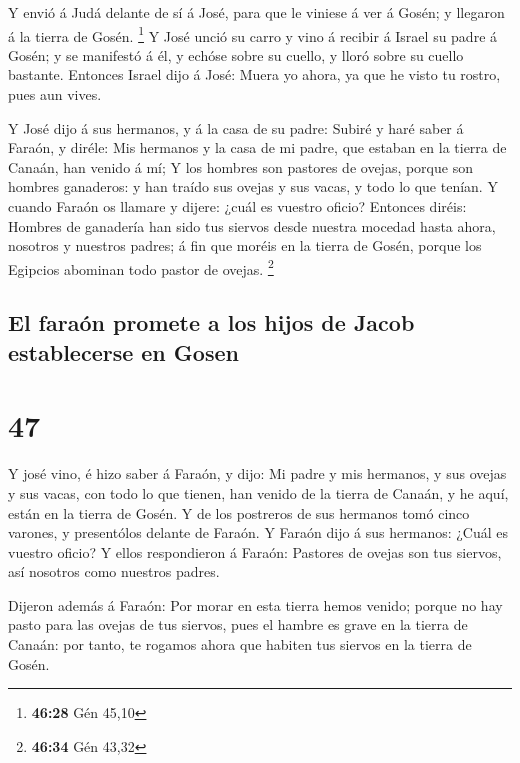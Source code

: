  Y envió á Judá delante de sí á José, para que le viniese á
ver á Gosén; y llegaron á la tierra de Gosén. \footnote{\textbf{46:28}
  Gén 45,10}  Y José unció su carro y vino á recibir á
Israel su padre á Gosén; y se manifestó á él, y echóse sobre su cuello,
y lloró sobre su cuello bastante.  Entonces Israel dijo á
José: Muera yo ahora, ya que he visto tu rostro, pues aun vives.

 Y José dijo á sus hermanos, y á la casa de su padre:
Subiré y haré saber á Faraón, y diréle: Mis hermanos y la casa de mi
padre, que estaban en la tierra de Canaán, han venido á mí;
 Y los hombres son pastores de ovejas, porque son hombres
ganaderos: y han traído sus ovejas y sus vacas, y todo lo que tenían.
 Y cuando Faraón os llamare y dijere: ¿cuál es vuestro
oficio?  Entonces diréis: Hombres de ganadería han sido tus
siervos desde nuestra mocedad hasta ahora, nosotros y nuestros padres; á
fin que moréis en la tierra de Gosén, porque los Egipcios abominan todo
pastor de ovejas. \footnote{\textbf{46:34} Gén 43,32}

\hypertarget{el-farauxf3n-promete-a-los-hijos-de-jacob-establecerse-en-gosen}{%
\subsection{El faraón promete a los hijos de Jacob establecerse en
Gosen}\label{el-farauxf3n-promete-a-los-hijos-de-jacob-establecerse-en-gosen}}

\hypertarget{section-46}{%
\section{47}\label{section-46}}

 Y josé vino, é hizo saber á Faraón, y dijo: Mi padre y mis
hermanos, y sus ovejas y sus vacas, con todo lo que tienen, han venido
de la tierra de Canaán, y he aquí, están en la tierra de Gosén.
 Y de los postreros de sus hermanos tomó cinco varones, y
presentólos delante de Faraón.  Y Faraón dijo á sus
hermanos: ¿Cuál es vuestro oficio? Y ellos respondieron á Faraón:
Pastores de ovejas son tus siervos, así nosotros como nuestros padres.

 Dijeron además á Faraón: Por morar en esta tierra hemos
venido; porque no hay pasto para las ovejas de tus siervos, pues el
hambre es grave en la tierra de Canaán: por tanto, te rogamos ahora que
habiten tus siervos en la tierra de Gosén.

